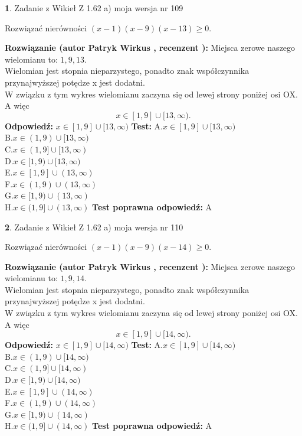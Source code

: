 \documentclass[12pt, a4paper]{article}
\theoremstyle{definition} %
\newtheorem{zad}{}
\newcommand{\zadStart}[1]{\begin{zad}#1\newline}
\newcommand{\zadStop}{\end{zad}}
\newcommand{\rozwStart}[2]{\noindent \textbf{Rozwiązanie (autor #1 , recenzent #2): }\newline}
\newcommand{\rozwStop}{\newline}
\newcommand{\odpStart}{\noindent \textbf{Odpowiedź:}\newline}
\newcommand{\odpStop}{\newline}
\newcommand{\testStart}{\noindent \textbf{Test:}\newline}
\newcommand{\testStop}{\newline}
\newcommand{\kluczStart}{\noindent \textbf{Test poprawna odpowiedź:}\newline}
\newcommand{\kluczStop}{\newline}
\begin{document}
\zadStart{Zadanie z Wikieł Z 1.62 a) moja wersja nr 109}

Rozwiązać nierówności $(x-1)(x-9)(x-13)\ge0$.
\zadStop
\rozwStart{Patryk Wirkus}{}
Miejsca zerowe naszego wielomianu to: $1, 9, 13$.\\
Wielomian jest stopnia nieparzystego, ponadto znak współczynnika przy\linebreak najwyższej potędze x jest dodatni.\\ W związku z tym wykres wielomianu zaczyna się od lewej strony poniżej osi OX. A więc $$x \in [1,9] \cup [13,\infty).$$
\rozwStop
\odpStart
$x \in [1,9] \cup [13,\infty)$
\odpStop
\testStart
A.$x \in [1,9] \cup [13,\infty)$\\
B.$x \in (1,9) \cup [13,\infty)$\\
C.$x \in (1,9] \cup [13,\infty)$\\
D.$x \in [1,9) \cup [13,\infty)$\\
E.$x \in [1,9] \cup (13,\infty)$\\
F.$x \in (1,9) \cup (13,\infty)$\\
G.$x \in [1,9) \cup (13,\infty)$\\
H.$x \in (1,9] \cup (13,\infty)$
\testStop
\kluczStart
A
\kluczStop



\zadStart{Zadanie z Wikieł Z 1.62 a) moja wersja nr 110}

Rozwiązać nierówności $(x-1)(x-9)(x-14)\ge0$.
\zadStop
\rozwStart{Patryk Wirkus}{}
Miejsca zerowe naszego wielomianu to: $1, 9, 14$.\\
Wielomian jest stopnia nieparzystego, ponadto znak współczynnika przy\linebreak najwyższej potędze x jest dodatni.\\ W związku z tym wykres wielomianu zaczyna się od lewej strony poniżej osi OX. A więc $$x \in [1,9] \cup [14,\infty).$$
\rozwStop
\odpStart
$x \in [1,9] \cup [14,\infty)$
\odpStop
\testStart
A.$x \in [1,9] \cup [14,\infty)$\\
B.$x \in (1,9) \cup [14,\infty)$\\
C.$x \in (1,9] \cup [14,\infty)$\\
D.$x \in [1,9) \cup [14,\infty)$\\
E.$x \in [1,9] \cup (14,\infty)$\\
F.$x \in (1,9) \cup (14,\infty)$\\
G.$x \in [1,9) \cup (14,\infty)$\\
H.$x \in (1,9] \cup (14,\infty)$
\testStop
\kluczStart
A
\kluczStop
\end{document}
